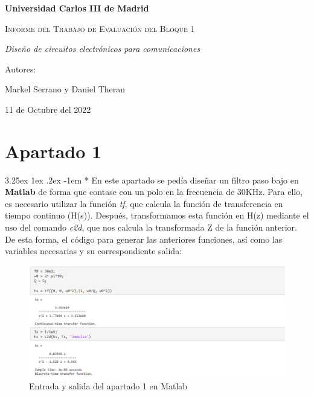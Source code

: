 \documentclass[12pt]{article}
\makeatletter
\renewcommand\paragraph{\@startsection{paragraph}{5}{\z@}%
  {3.25ex \@plus1ex \@minus.2ex}%
  {-1em}%
  {\normalfont\normalsize\bfseries}}
\makeatother
\begin{document}
  \begin{titlepage}
    \centering
   {\bfseries\Large Universidad Carlos III de Madrid \par}
    \vspace{5cm}
    {\scshape\Huge Informe del Trabajo de Evaluación del Bloque 1 \par}
    \vspace{2cm}
    {\itshape\Large Diseño de circuitos electrónicos para comunicaciones}
    \vfill
    {\Large Autores: \par}
    \vspace{1cm}
    {\Large Markel Serrano y Daniel Theran}
    \vfill
    {\Large 11 de Octubre del 2022 \par}
  \end{titlepage}

  \section*{Apartado 1}

    \paragraph*{}
    En este apartado se pedía diseñar un filtro paso bajo en \textbf{Matlab} de forma que contase con un polo en la frecuencia de 30KHz.
    Para ello, es necesario utilizar la función \textit{tf}, que calcula la función de transferencia en tiempo continuo (H(s)).
    Después, transformamos esta función en H(z) mediante el uso del comando \textit{c2d}, que nos calcula la transformada Z de la función anterior.
    De esta forma, el código para generar las anteriores funciones, así como las variables necesarias y su correspondiente salida:

    \begin{figure}[H]
      \centering
      \includegraphics[width=1\linewidth]{Img/img_apartado_1.PNG}
      \caption{Entrada y salida del apartado 1 en Matlab}%
      \label{fig:img1}
  \end{figure}
\end{document}
